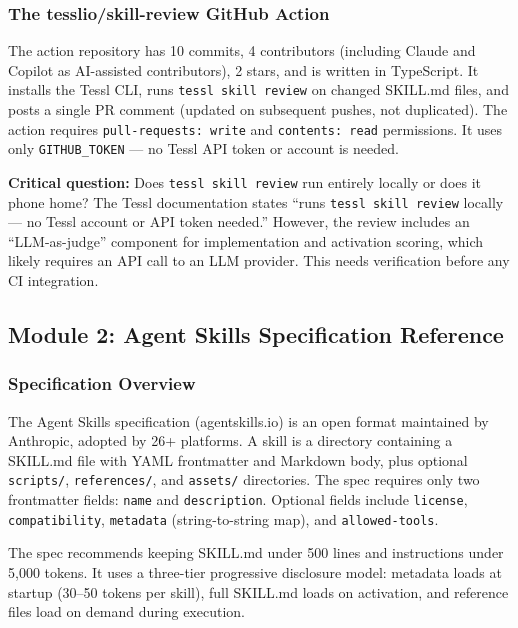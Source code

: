 \documentclass[11pt,letterpaper]{article}
\begin{document}
\subsubsection{The tesslio/skill-review GitHub Action}

The action repository has 10 commits, 4 contributors (including Claude and Copilot as AI-assisted contributors), 2 stars, and is written in TypeScript. It installs the Tessl CLI, runs \texttt{tessl skill review} on changed SKILL.md files, and posts a single PR comment (updated on subsequent pushes, not duplicated). The action requires \texttt{pull-requests: write} and \texttt{contents: read} permissions. It uses only \texttt{GITHUB\_TOKEN} --- no Tessl API token or account is needed.

\textbf{Critical question:} Does \texttt{tessl skill review} run entirely locally or does it phone home? The Tessl documentation states ``runs \texttt{tessl skill review} locally --- no Tessl account or API token needed.'' However, the review includes an ``LLM-as-judge'' component for implementation and activation scoring, which likely requires an API call to an LLM provider. This needs verification before any CI integration.

\subsection{Module 2: Agent Skills Specification Reference}

\subsubsection{Specification Overview}

The Agent Skills specification (agentskills.io) is an open format maintained by Anthropic, adopted by 26+ platforms. A skill is a directory containing a SKILL.md file with YAML frontmatter and Markdown body, plus optional \texttt{scripts/}, \texttt{references/}, and \texttt{assets/} directories. The spec requires only two frontmatter fields: \texttt{name} and \texttt{description}. Optional fields include \texttt{license}, \texttt{compatibility}, \texttt{metadata} (string-to-string map), and \texttt{allowed-tools}.

The spec recommends keeping SKILL.md under 500 lines and instructions under 5,000 tokens. It uses a three-tier progressive disclosure model: metadata loads at startup (30--50 tokens per skill), full SKILL.md loads on activation, and reference files load on demand during execution.
\end{document}
